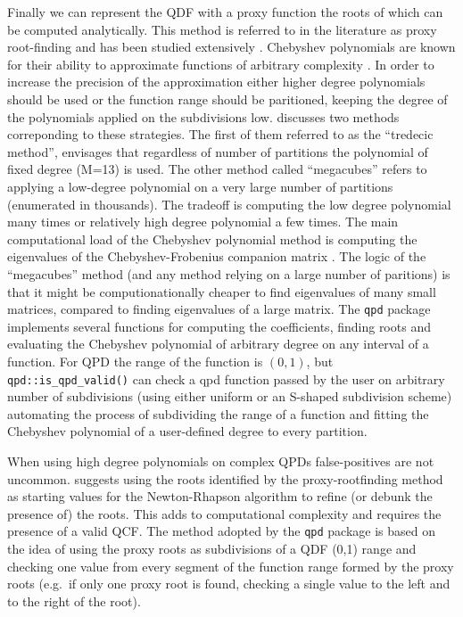 \documentclass[
  12pt,
]{article}
\begin{document}
Finally we can represent the QDF with a proxy function the roots of which can be computed analytically. This method is referred to in the literature as proxy root-finding and has been studied extensively \citep{boyd2013FindingZerosUnivariate}. Chebyshev polynomials are known for their ability to approximate functions of arbitrary complexity \citep{boyd2007NumericalExperimentsAccuracy}. In order to increase the precision of the approximation either higher degree polynomials should be used or the function range should be paritioned, keeping the degree of the polynomials applied on the subdivisions low. \citet{boyd2006ComputingRealRoots} discusses two methods correponding to these strategies. The first of them referred to as the ``tredecic method'', envisages that regardless of number of partitions the polynomial of fixed degree (M=13) is used. The other method called ``megacubes'' refers to applying a low-degree polynomial on a very large number of partitions (enumerated in thousands). The tradeoff is computing the low degree polynomial many times or relatively high degree polynomial a few times. The main computational load of the Chebyshev polynomial method is computing the eigenvalues of the Chebyshev-Frobenius companion matrix \citep{boyd2013FindingZerosUnivariate}. The logic of the ``megacubes'' method (and any method relying on a large number of paritions) is that it might be computionationally cheaper to find eigenvalues of many small matrices, compared to finding eigenvalues of a large matrix. The \texttt{qpd} package \citep{perepolkin2019QpdToolsQuantileparameterized} implements several functions for computing the coefficients, finding roots and evaluating the Chebyshev polynomial of arbitrary degree on any interval of a function. For QPD the range of the function is \((0,1)\), but \texttt{qpd::is\_qpd\_valid()} can check a qpd function passed by the user on arbitrary number of subdivisions (using either uniform or an S-shaped subdivision scheme) automating the process of subdividing the range of a function and fitting the Chebyshev polynomial of a user-defined degree to every partition.

When using high degree polynomials on complex QPDs false-positives are not uncommon. \citet{boyd2006ComputingRealRoots} suggests using the roots identified by the proxy-rootfinding method as starting values for the Newton-Rhapson algorithm to refine (or debunk the presence of) the roots. This adds to computational complexity and requires the presence of a valid QCF. The method adopted by the \texttt{qpd} package is based on the idea of using the proxy roots as subdivisions of a QDF (0,1) range and checking one value from every segment of the function range formed by the proxy roots (e.g.~if only one proxy root is found, checking a single value to the left and to the right of the root).
\end{document}
